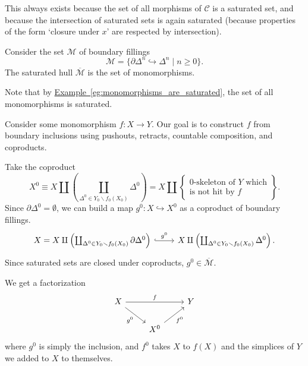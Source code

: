 \documentclass[main.tex]{subfiles}
\begin{document}
\begin{note}
  This always exists because the set of all morphisms of $\mathcal{C}$ is a saturated set, and because the intersection of saturated sets is again saturated (because properties of the form `closure under $x$' are respected by intersection).
\end{note}

\begin{example}
  Consider the set $\mathcal{M}$ of boundary fillings
  \begin{equation*}
    \mathcal{M} = \{\partial \Delta^{n} \hookrightarrow \Delta^{n} \mid n \geq 0\}.
  \end{equation*}
  The saturated hull $\overline{\mathcal{M}}$ is the set of monomorphisms.

  Note that by \hyperref[eg:monomorphisms_are_saturated]{Example~\ref*{eg:monomorphisms_are_saturated}}, the set of all monomorphisms is saturated.

  Consider some monomorphism $f\colon X \to Y$. Our goal is to construct $f$ from boundary inclusions using pushouts, retracts, countable composition, and coproducts.

  Take the coproduct
  \begin{equation*}
    X^{0} \equiv X \amalg \left( \coprod_{\Delta^{0} \in Y_{0} \smallsetminus f_{0}(X_{0})} \Delta^{0} \right) = X \amalg \left\{ \substack{\text{0-skeleton of $Y$ which}\\\text{is not hit by $f$}} \right\}.
  \end{equation*}
  Since $\partial \Delta^{0} = \emptyset$, we can build a map $g^{0}\colon X \hookrightarrow X^{0}$ as a coproduct of boundary fillings.
  \begin{equation*}
    \begin{tikzcd}
      X = X \amalg \left( \coprod_{\Delta^{0} \in Y_{0} \smallsetminus f_{0}(X_{0})} \partial \Delta^{0} \right)
      \arrow[hookrightarrow, r, "g^{0}"]
      & X \amalg \left( \coprod_{\Delta^{0} \in Y_{0} \smallsetminus f_{0}(X_{0})} \Delta^{0} \right).
    \end{tikzcd}
  \end{equation*}
  Since saturated sets are closed under coproducts, $g^{0} \in \overline{\mathcal{M}}$.

  We get a factorization
  \begin{equation*}
    \begin{tikzcd}
      X
      \arrow[rr, "f"]
      \arrow[dr, swap, "g^{0}"]
      && Y
      \\
      & X^{0}
      \arrow[ur, swap, "f^{0}"]
    \end{tikzcd}
  \end{equation*}
  where $g^{0}$ is simply the inclusion, and $f^{0}$ takes $X$ to $f(X)$ and the simplices of $Y$ we added to $X$ to themselves.


\end{example}
\end{document}
